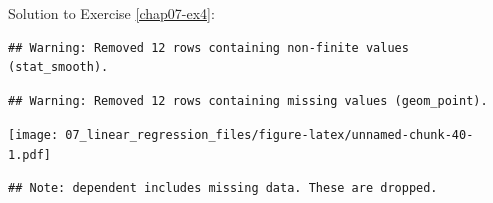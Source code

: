 \documentclass[
  12pt,
  krantz2]{krantz}
\makeatletter
\newenvironment{Shaded}{\begin{snugshade}}{\end{snugshade}}
\newcommand{\CommentTok}[1]{\textcolor[rgb]{0.56,0.35,0.01}{\textit{#1}}}
\newcommand{\DataTypeTok}[1]{\textcolor[rgb]{0.13,0.29,0.53}{#1}}
\newcommand{\KeywordTok}[1]{\textcolor[rgb]{0.13,0.29,0.53}{\textbf{#1}}}
\newcommand{\NormalTok}[1]{#1}
\newcommand{\OperatorTok}[1]{\textcolor[rgb]{0.81,0.36,0.00}{\textbf{#1}}}
\newcommand{\OtherTok}[1]{\textcolor[rgb]{0.56,0.35,0.01}{#1}}
\newcommand{\StringTok}[1]{\textcolor[rgb]{0.31,0.60,0.02}{#1}}
\newenvironment{kframe}{%
\medskip{}
\setlength{\fboxsep}{.8em}
 \def\at@end@of@kframe{}%
 \ifinner\ifhmode%
  \def\at@end@of@kframe{\end{minipage}}%
  \begin{minipage}{\columnwidth}%
 \fi\fi%
 \def\FrameCommand##1{\hskip\@totalleftmargin \hskip-\fboxsep
 \colorbox{shadecolor}{##1}\hskip-\fboxsep
     \hskip-\linewidth \hskip-\@totalleftmargin \hskip\columnwidth}%
 \MakeFramed {\advance\hsize-\width
   \@totalleftmargin\z@ \linewidth\hsize
   \@setminipage}}%
 {\par\unskip\endMakeFramed%
 \at@end@of@kframe}
\renewenvironment{Shaded}{\begin{kframe}}{\end{kframe}}
\makeatother
\begin{document}
Solution to Exercise \ref{chap07-ex4}:

\begin{Shaded}
\end{Shaded}

\begin{verbatim}
## Warning: Removed 12 rows containing non-finite values (stat_smooth).
\end{verbatim}

\begin{verbatim}
## Warning: Removed 12 rows containing missing values (geom_point).
\end{verbatim}

\texttt{[image: 07\_linear\_regression\_files/figure-latex/unnamed-chunk-40-1.pdf]}

\begin{Shaded}
\end{Shaded}

\begin{verbatim}
## Note: dependent includes missing data. These are dropped.
\end{verbatim}
\end{document}

